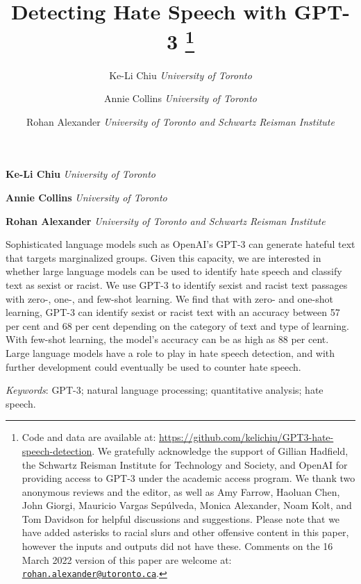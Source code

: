 \documentclass[12pt,]{article}
\title{Detecting Hate Speech with GPT-3 \thanks{Code and data are available at: \url{https://github.com/kelichiu/GPT3-hate-speech-detection}. We gratefully acknowledge the support of Gillian Hadfield, the Schwartz Reisman Institute for Technology and Society, and OpenAI for providing access to GPT-3 under the academic access program. We thank two anonymous reviews and the editor, as well as Amy Farrow, Haoluan Chen, John Giorgi, Mauricio Vargas Sepúlveda, Monica Alexander, Noam Kolt, and Tom Davidson for helpful discussions and suggestions. Please note that we have added asterisks to racial slurs and other offensive content in this paper, however the inputs and outputs did not have these. Comments on the 16 March 2022 version of this paper are welcome at: \href{mailto:rohan.alexander@utoronto.ca}{\nolinkurl{rohan.alexander@utoronto.ca}}.}  }
\author{\Large Ke-Li Chiu\vspace{0.05in} \newline\normalsize\emph{University of Toronto}   \and \Large Annie Collins\vspace{0.05in} \newline\normalsize\emph{University of Toronto}   \and \Large Rohan Alexander\vspace{0.05in} \newline\normalsize\emph{University of Toronto and Schwartz Reisman Institute}  }
\date{}
\newcommand*{\authorfont}{\fontfamily{phv}\selectfont}
\renewenvironment{abstract}
 {{%
    \setlength{\leftmargin}{0mm}
    \setlength{\rightmargin}{\leftmargin}%
  }%
  \relax}
 {\endlist}
\begin{document}
	
%    


{%
\setlength{\parindent}{0pt}
\thispagestyle{plain}
{\fontsize{18}{20}\selectfont\raggedright 
\maketitle  %

}

{
   \vskip 13.5pt\relax \normalsize\fontsize{11}{12} 
\textbf{\authorfont Ke-Li Chiu} \hskip 15pt \emph{\small University of Toronto}   \par \textbf{\authorfont Annie Collins} \hskip 15pt \emph{\small University of Toronto}   \par \textbf{\authorfont Rohan Alexander} \hskip 15pt \emph{\small University of Toronto and Schwartz Reisman Institute}   

}

}








\begin{abstract}

    \hbox{\vrule height .2pt width 39.14pc}

    \vskip 8.5pt %

\noindent Sophisticated language models such as OpenAI's GPT-3 can generate hateful text that targets marginalized groups. Given this capacity, we are interested in whether large language models can be used to identify hate speech and classify text as sexist or racist. We use GPT-3 to identify sexist and racist text passages with zero-, one-, and few-shot learning. We find that with zero- and one-shot learning, GPT-3 can identify sexist or racist text with an accuracy between 57 per cent and 68 per cent depending on the category of text and type of learning. With few-shot learning, the model's accuracy can be as high as 88 per cent. Large language models have a role to play in hate speech detection, and with further development could eventually be used to counter hate speech.


\vskip 8.5pt \noindent \emph{Keywords}: GPT-3; natural language processing; quantitative analysis; hate speech. \par

    \hbox{\vrule height .2pt width 39.14pc}



\end{abstract}
\end{document}
